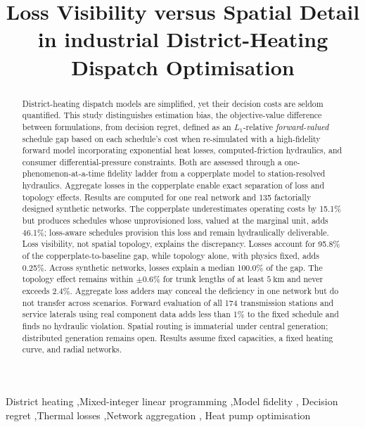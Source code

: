 \documentclass[a4paper,fleqn]{cas-sc}
\begin{document}
\title[mode=title]{%
  Loss Visibility versus Spatial Detail in industrial District-Heating Dispatch Optimisation}



\begin{abstract}
District-heating dispatch models are simplified, yet their decision costs are
seldom quantified. This study distinguishes estimation bias, the objective-value
difference between formulations, from decision regret, defined as an
\(L_1\)-relative \emph{forward-valued} schedule gap based on each schedule's cost
when re-simulated with a high-fidelity forward model incorporating exponential
heat losses, computed-friction hydraulics, and consumer differential-pressure
constraints. Both are assessed through a one-phenomenon-at-a-time fidelity ladder
from a copperplate model to station-resolved hydraulics. Aggregate losses in the
copperplate enable exact separation of loss and topology effects. Results are computed for one real network and 135 factorially designed synthetic networks. The copperplate
underestimates operating costs by 15.1\% but produces schedules whose unprovisioned
loss, valued at the marginal unit, adds 46.1\%; loss-aware schedules provision this
loss and remain hydraulically deliverable. Loss visibility, not spatial topology,
explains the discrepancy. Losses account for 95.8\% of the
copperplate-to-baseline gap, while topology alone, with physics fixed, adds 0.25\%.
Across synthetic networks, losses explain a median 100.0\% of the gap. The topology
effect remains within \(\pm 0.6\%\) for trunk lengths of at least \(5~\mathrm{km}\)
and never exceeds 2.4\%. Aggregate loss adders may conceal the deficiency in one
network but do not transfer across scenarios. Forward evaluation of all 174
transmission stations and service laterals using real component data adds less
than 1\% to the fixed schedule and finds no hydraulic violation. Spatial routing is immaterial under central generation; distributed
generation remains open. Results assume fixed capacities, a fixed heating curve,
and radial networks.
\end{abstract}

\begin{keywords}
District heating \sep Mixed-integer linear programming \sep Model fidelity \sep
Decision regret \sep Thermal losses \sep Network aggregation \sep
Heat pump optimisation
\end{keywords}

\maketitle
\end{document}
